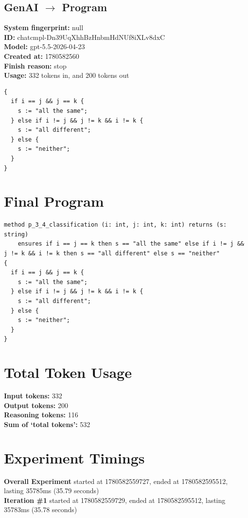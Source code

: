 \documentclass{article}
\begin{document}
\subsection*{GenAI $\rightarrow$ Program}
\textbf{System fingerprint: }null
\\\textbf{ID: }chatcmpl-Dn39UqXhhBzHnbmHdNUf8iXLv8dxC
\\\textbf{Model: }gpt-5.5-2026-04-23
\\\textbf{Created at: }1780582560
\\\textbf{Finish reason: }stop
\\\textbf{Usage: }332 tokens in, and 200 tokens out
\begin{lstlisting}
{
  if i == j && j == k {
    s := "all the same";
  } else if i != j && j != k && i != k {
    s := "all different";
  } else {
    s := "neither";
  }
}
\end{lstlisting}
\section*{Final Program}
\begin{lstlisting}
method p_3_4_classification (i: int, j: int, k: int) returns (s: string)
	ensures if i == j == k then s == "all the same" else if i != j && j != k && i != k then s == "all different" else s == "neither"
{
  if i == j && j == k {
    s := "all the same";
  } else if i != j && j != k && i != k {
    s := "all different";
  } else {
    s := "neither";
  }
}
\end{lstlisting}
\section*{Total Token Usage}
\textbf{Input tokens: }332
\\\textbf{Output tokens: }200
\\\textbf{Reasoning tokens: }116
\\\textbf{Sum of `total tokens': }532
\section*{Experiment Timings}
\textbf{Overall Experiment} started at 1780582559727, ended at 1780582595512, lasting 35785ms (35.79 seconds)
\\\textbf{Iteration \#1} started at 1780582559729, ended at 1780582595512, lasting 35783ms (35.78 seconds)
\end{document}
